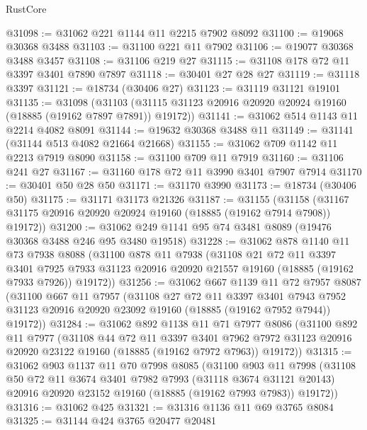 \begin{lexlean}{RustCore}
\begin{coremodule}
@31098 := @31062 @221 @1144 @11 @2215 @7902 @8092
@31100 := @19068 @30368 @3488
@31103 := @31100 @221 @11 @7902
@31106 := @19077 @30368 @3488 @3457
@31108 := @31106 @219 @27
@31115 := @31108 @178 @72 @11 @3397 @3401 @7890 @7897
@31118 := @30401 @27 @28 @27
@31119 := @31118 @3397
@31121 := @18734 (@30406 @27)
@31123 := @31119 @31121 @19101
@31135 := @31098
    (@31103 (@31115 @31123 @20916 @20920 @20924 @19160 (@18885 (@19162 @7897 @7891)) @19172))
@31141 := @31062 @514 @1143 @11 @2214 @4082 @8091
@31144 := @19632 @30368 @3488 @11
@31149 := @31141 (@31144 @513 @4082 @21664 @21668)
@31155 := @31062 @709 @1142 @11 @2213 @7919 @8090
@31158 := @31100 @709 @11 @7919
@31160 := @31106 @241 @27
@31167 := @31160 @178 @72 @11 @3990 @3401 @7907 @7914
@31170 := @30401 @50 @28 @50
@31171 := @31170 @3990
@31173 := @18734 (@30406 @50)
@31175 := @31171 @31173 @21326
@31187 := @31155
    (@31158 (@31167 @31175 @20916 @20920 @20924 @19160 (@18885 (@19162 @7914 @7908)) @19172))
@31200 := @31062 @249 @1141 @95 @74 @3481 @8089 (@19476 @30368 @3488 @246 @95 @3480 @19518)
@31228 := @31062
    @878
    @1140
    @11
    @73
    @7938
    @8088
    (@31100
      @878
      @11
      @7938
      (@31108
        @21
        @72
        @11
        @3397
        @3401
        @7925
        @7933
        @31123
        @20916
        @20920
        @21557
        @19160
        (@18885 (@19162 @7933 @7926))
        @19172))
@31256 := @31062
    @667
    @1139
    @11
    @72
    @7957
    @8087
    (@31100
      @667
      @11
      @7957
      (@31108
        @27
        @72
        @11
        @3397
        @3401
        @7943
        @7952
        @31123
        @20916
        @20920
        @23092
        @19160
        (@18885 (@19162 @7952 @7944))
        @19172))
@31284 := @31062
    @892
    @1138
    @11
    @71
    @7977
    @8086
    (@31100
      @892
      @11
      @7977
      (@31108
        @44
        @72
        @11
        @3397
        @3401
        @7962
        @7972
        @31123
        @20916
        @20920
        @23122
        @19160
        (@18885 (@19162 @7972 @7963))
        @19172))
@31315 := @31062
    @903
    @1137
    @11
    @70
    @7998
    @8085
    (@31100
      @903
      @11
      @7998
      (@31108
        @50
        @72
        @11
        @3674
        @3401
        @7982
        @7993
        (@31118 @3674 @31121 @20143)
        @20916
        @20920
        @23152
        @19160
        (@18885 (@19162 @7993 @7983))
        @19172))
@31316 := @31062 @425
@31321 := @31316 @1136 @11 @69 @3765 @8084
@31325 := @31144 @424 @3765 @20477 @20481

\end{coremodule}
\end{lexlean}
